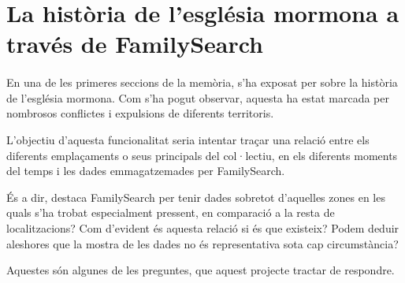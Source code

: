 \section{La història de l'església mormona a través de Family\-Search}

    \paragraph{}
    En una de les primeres seccions de la memòria, s'ha exposat per sobre la història de l'església mormona. Com s'ha pogut observar, aquesta ha estat marcada per nombrosos conflictes i expulsions de diferents territoris.

    L'objectiu d'aquesta funcionalitat seria intentar traçar una relació entre els di\-fe\-rents emplaçaments o seus principals del col·lectiu, en els diferents moments del temps i les dades emmagatzemades per FamilySearch.

    És a dir, destaca FamilySearch per tenir dades sobretot d'aquelles zones en les quals s'ha trobat especialment pressent, en comparació a la resta de localitzacions? Com d'evident és aquesta relació si és que existeix? Podem deduir aleshores que la mostra de les dades no és representativa sota cap circumstància?

    Aquestes són algunes de les preguntes, que aquest projecte tractar de respondre.
